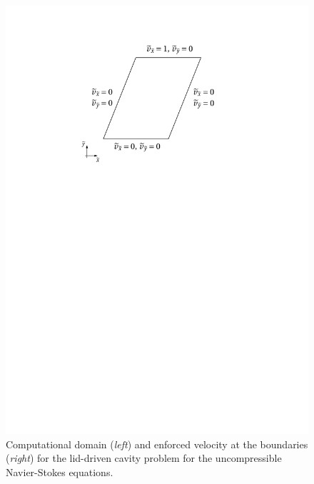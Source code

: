 \documentclass[12pt, a4paper, twoside, openright]{report}
\numberwithin{equation}{chapter}
\theoremstyle{theorem}
\theoremstyle{definition}
\theoremstyle{remark}
\theoremstyle{proposition}
\numberwithin{figure}{chapter}
\begin{document}
\begin{figure}[H]
			\includegraphics[scale = 0.75]{dc_domain_bc}
			
			\caption{Computational domain (\emph{left}) and enforced velocity at the boundaries (\emph{right}) for the lid-driven cavity problem for the uncompressible Navier-Stokes equations.}
			\label{}
		\end{figure}
		
\end{document}
